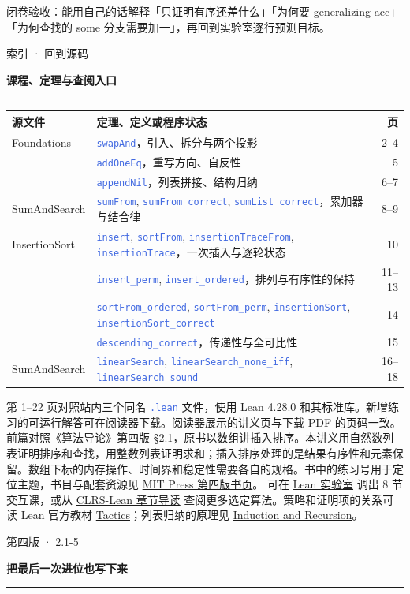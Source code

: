 \documentclass[UTF8,11pt,a4paper,fontset=fandol]{ctexart}
\newcommand{\HandoutLesson}[2]{%
  \par{\small\heiti\color{BrickRed}#1}\par\vspace{3pt}
  {\fontsize{21}{27}\selectfont\heiti\bfseries #2}\par
  \textcolor{BrickRed}{\rule{\linewidth}{.7pt}}\par}
\newcommand{\HandoutBox}[1]{%
  \par\noindent\begingroup\setlength{\fboxsep}{8pt}%
  \colorbox{BrickRed!9}{\parbox{\dimexpr\linewidth-16pt\relax}{#1}}\endgroup\par}
\newcommand{\src}[1]{\textcolor{RoyalBlue}{\texttt{#1}}}
\newcommand{\subhead}[1]{\par\vspace{3pt}{\heiti\bfseries\color{RoyalBlue}#1}\par}
\begin{document}
\HandoutBox{闭卷验收：能用自己的话解释「只证明有序还差什么」「为何要 generalizing acc」「为何查找的 some 分支需要加一」，再回到实验室逐行预测目标。}
\clearpage{}\label{p22}\HandoutLesson{索引 · 回到源码}{课程、定理与查阅入口}
\begin{tabularx}{\linewidth}{@{}l>{\raggedright\arraybackslash}Xr@{}}\toprule
源文件 & 定理、定义或程序状态 & 页\\\midrule
Foundations & \src{swapAnd}，引入、拆分与两个投影 & 2–4\\
& \src{addOneEq}，重写方向、自反性 & 5\\
& \src{appendNil}，列表拼接、结构归纳 & 6–7\\
SumAndSearch & \src{sumFrom}, \src{sumFrom\_correct}, \src{sumList\_correct}，累加器与结合律 & 8–9\\
InsertionSort & \src{insert}, \src{sortFrom}, \src{insertionTraceFrom}, \src{insertionTrace}，一次插入与逐轮状态 & 10\\
& \src{insert\_perm}, \src{insert\_ordered}，排列与有序性的保持 & 11–13\\
& \src{sortFrom\_ordered}, \src{sortFrom\_perm}, \src{insertionSort}, \src{insertionSort\_correct} & 14\\
& \src{descending\_correct}，传递性与全可比性 & 15\\
SumAndSearch & \src{linearSearch}, \src{linearSearch\_none\_iff}, \src{linearSearch\_sound} & 16–18\\\bottomrule\end{tabularx}
\subhead{版本、模型与资料}
第 1–22 页对照站内三个同名 \src{.lean} 文件，使用 Lean 4.28.0 和其标准库。新增练习的可运行解答可在阅读器下载。阅读器展示的讲义页与下载 PDF 的页码一致。
前篇对照《算法导论》第四版 §2.1，原书以数组讲插入排序。本讲义用自然数列表证明排序和查找，用整数列表证明求和；插入排序处理的是结果有序性和元素保留。数组下标的内存操作、时间界和稳定性需要各自的规格。书中的练习号用于定位主题，书目与配套资源见 \href{https://mitpress.mit.edu/9780262046305/introduction-to-algorithms/}{MIT Press 第四版书页}。
可在 \href{https://yeyaozhi.eu.cc/learning/lean-lab/}{Lean 实验室} 调出 8 节交互课，或从 \href{https://tanktechnology.github.io/CLRS-Lean/}{CLRS-Lean 章节导读} 查阅更多选定算法。策略和证明项的关系可读 Lean 官方教材 \href{https://lean-lang.org/theorem_proving_in_lean4/Tactics/}{Tactics}；列表归纳的原理见 \href{https://lean-lang.org/theorem_proving_in_lean4/Induction-and-Recursion/}{Induction and Recursion}。
\clearpage{}\label{p23}\HandoutLesson{第四版 · 2.1-5}{把最后一次进位也写下来}
\end{document}
